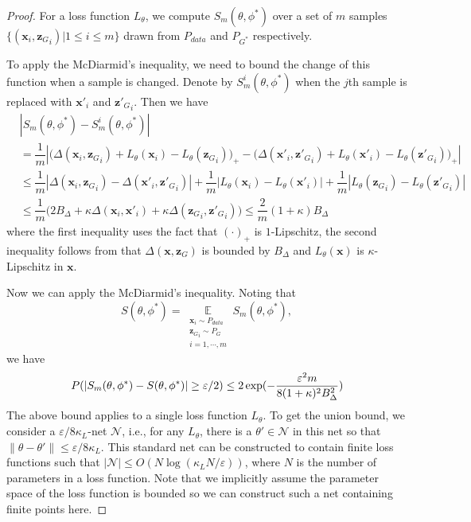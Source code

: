 \begin{proof}
For a loss function $L_\theta$, we compute $S_m(\theta,\phi^*)$ over a set of $m$ samples $\{(\mathbf x_i, {\mathbf z_G}_i)|1\leq i\leq m\}$ drawn from $P_{data}$ and $P_{G^*}$ respectively.

To apply the McDiarmid's inequality, we need to bound the change of this function when a sample is changed.  Denote by $S^i_m(\theta,\phi^*)$ when the $j$th sample is replaced with $\mathbf x'_i$ and ${\mathbf z'_G}_i$. Then we have
\[
\begin{aligned}
&|S_m(\theta,\phi^*)-S^i_m(\theta,\phi^*)|\\
&=\dfrac{1}{m}|\big(\Delta(\mathbf x_i, {\mathbf z_G}_i)+L_\theta(\mathbf x_i)-L_\theta({\mathbf z_G}_i)\big)_+
-\big(\Delta(\mathbf x'_i, {\mathbf z'_G}_i)+L_\theta(\mathbf x'_i)-L_\theta({\mathbf z'_G}_i)\big)_+|\\
&\leq \dfrac{1}{m}|\Delta(\mathbf x_i, {\mathbf z_G}_i)-\Delta(\mathbf x'_i, {\mathbf z'_G}_i)|
+\dfrac{1}{m}|L_\theta(\mathbf x_i)-L_\theta(\mathbf x'_i)|
+\dfrac{1}{m}|L_\theta({\mathbf z_G}_i)-L_\theta({\mathbf z'_G}_i)|\\
&\leq \dfrac{1}{m}\big(2B_\Delta+\kappa \Delta(\mathbf x_i,\mathbf x'_i) + \kappa \Delta({\mathbf z_G}_i,{\mathbf z'_G}_i)\big)
\leq \dfrac{2}{m}(1+\kappa)B_\Delta
\end{aligned}
\]
where the first inequality uses the fact that $(\cdot)_+$ is $1$-Lipschitz, the second inequality follows from that
$\Delta(\mathbf x, \mathbf z_G)$ is bounded by $B_\Delta$ and $L_\theta(\mathbf x)$ is $\kappa$-Lipschitz in $\mathbf x$.

Now we can apply the McDiarmid's inequality. Noting that
$$S(\theta,\phi^*)=\mathop\mathbb E\limits_{\substack{\mathbf x_i\sim P_{data}\\ {\mathbf z_G}_i\sim  P_G\\i=1,\cdots,m}}S_m(\theta,\phi^*),$$
we have
\begin{equation}\label{eq:mcdiarmid}
\small
P(|S_m(\theta,\phi^*)-S(\theta,\phi^*)|\geq \varepsilon/2)\leq 2\exp(-\dfrac{\varepsilon^2 m}{8(1+\kappa)^2B_\Delta^2})
\end{equation}
The above bound applies to a single loss function $L_\theta$.  To get the union bound, we consider a $\varepsilon/8\kappa_L$-net $\mathcal N$, i.e., for any $L_\theta$, there is a $\theta'\in\mathcal N$ in this net so that $\|\theta-\theta'\|\leq \varepsilon/8\kappa_L$. This standard net can be constructed to contain finite loss functions such that $|\mathcal N|\leq O(N\log(\kappa_L N/\varepsilon))$, where $N$ is the number of parameters in a loss function. Note that we implicitly assume the parameter space of the loss function is bounded so we can construct such a net containing finite points here.


\end{proof}
